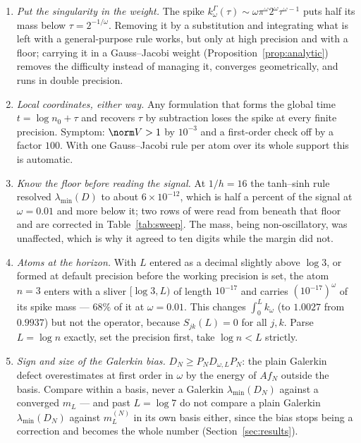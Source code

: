 \begin{enumerate}
\item \emph{Put the singularity in the weight.} The spike
$k^\Gamma_\omega(\tau)\sim\omega\pi^\omega2^\omega\tau^{\omega-1}$ puts half its
mass below $\tau=2^{-1/\omega}$. Removing it by a substitution and integrating
what is left with a general-purpose rule works, but only at high precision and
with a floor; carrying it in a Gauss--Jacobi weight
(Proposition~\ref{prop:analytic}) removes the difficulty instead of managing
it, converges geometrically, and runs in double precision.
\item \emph{Local coordinates, either way.} Any formulation that forms the
global time $t=\log n_0+\tau$ and recovers $\tau$ by subtraction loses the spike
at every finite precision. Symptom: $\norm V>1$ by $10^{-3}$ and a first-order
check off by a factor $100$. With one Gauss--Jacobi rule per atom over its whole
support this is automatic.
\item \emph{Know the floor before reading the signal.} At $1/h=16$ the
tanh--sinh rule resolved $\lambda_{\min}(D)$ to about $6\times10^{-12}$, which is
half a percent of the signal at $\omega=0.01$ and more below it; two rows of
\cite[Table~3.1]{ContractionNote} were read from beneath that floor and are
corrected in Table~\ref{tab:sweep}. The mass, being non-oscillatory, was
unaffected, which is why it agreed to ten digits while the margin did not.
\item \emph{Atoms at the horizon.} With $L$ entered as a decimal slightly above
$\log3$, or formed at default precision before the working precision is set, the
atom $n=3$ enters with a sliver $[\log3,L)$ of length $10^{-17}$ and carries
$(10^{-17})^\omega$ of its spike mass --- $68\%$ of it at $\omega=0.01$. This
changes $\int_0^Lk_\omega$ (to $1.0027$ from $0.9937$) but not the operator,
because $S_{jk}(L)=0$ for all $j,k$. Parse $L=\log n$ exactly, set the precision
first, take $\log n<L$ strictly.
\item \emph{Sign and size of the Galerkin bias.} $D_N\geq P_ND_{\omega,L}P_N$:
the plain Galerkin defect overestimates at first order in $\omega$ by the energy
of $Af_N$ outside the basis. Compare within a basis, never a Galerkin
$\lambda_{\min}(D_N)$ against a converged $m_L$ --- and past $L=\log7$ do not
compare a plain Galerkin $\lambda_{\min}(D_N)$ against $m_L^{(N)}$ in its own
basis either, since the bias stops being a correction and becomes the whole
number (Section~\ref{sec:results}).
\end{enumerate}
